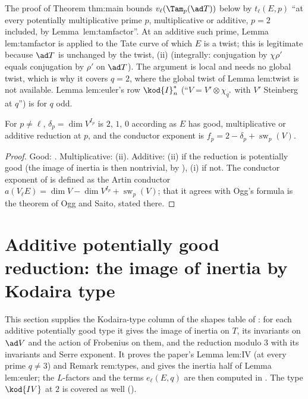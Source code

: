 \begin{paperlink}
The proof of Theorem thm:main bounds $v_\ell(\Tam_p(\ad T))$ below by $t_\ell(E,p)$ ``at every potentially multiplicative prime $p$,
multiplicative or additive, $p=2$ included, by Lemma~lem:tamfactor''. At an additive such prime, Lemma lem:tamfactor is applied to the
Tate curve of which $E$ is a twist; this is legitimate because $\ad T$ is unchanged by the twist, (ii) (integrally:
conjugation by $\chi\rho'$ equals conjugation by $\rho'$ on $\ad T$). The argument is local and needs no global twist, which is why it covers
$q=2$, where the global twist of Lemma lem:twist is not available. Lemma lem:euler's row $\kod{I}_n^*$ (``$V=V'\otimes\chi_{q^*}$ with $V'$ Steinberg
at $q$'') is  for $q$ odd.
\end{paperlink}

\begin{corollary}\label{cor:galrep:delta}
For $p\ne\ell$, $\delta_p=\dim V^{I_p}$ is $2$, $1$, $0$ according as $E$ has good, multiplicative or additive reduction at $p$, and the conductor
exponent is $f_p=2-\delta_p+\operatorname{sw}_p(V)$.
\end{corollary}

\begin{proof}
Good: . Multiplicative: (ii). Additive: (ii) if the reduction is
potentially good (the image of inertia is then nontrivial, by ), (i) if not. The conductor
exponent of  is defined as the Artin conductor $a(V_\ell E)=\dim V-\dim V^{I_p}+\operatorname{sw}_p(V)$; that it agrees with Ogg's formula
is the theorem of Ogg and Saito, stated there.
\end{proof}

\section[Additive potentially good reduction]{Additive potentially good reduction: the image of inertia by Kodaira type}\label{sec:galrep:additive}

This section supplies the Kodaira-type column of the shapes table of : for each additive potentially good type it gives
the image of inertia on $T$, its invariants on $\ad V$ and the action of Frobenius on them, and the reduction modulo $3$ with its invariants
and Serre exponent. It proves the paper's Lemma lem:IV (at every prime $q\ne3$) and Remark rem:types, and gives the inertia half of Lemma
lem:euler; the $L$-factors and the terms $e_\ell(E,q)$ are then computed in . The type $\kod{IV}$ at $2$ is covered as well
().

